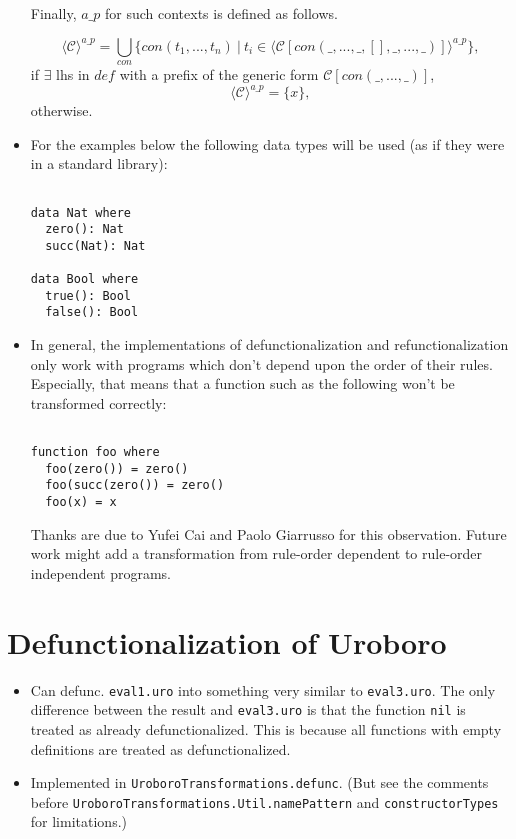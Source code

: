 \documentclass[11pt]{article} %
\begin{document}
\begin{itemize}
Finally, $a\_p$ for such contexts is defined as follows.

\begin{equation*}
\langle \mathcal{C} \rangle^{a\_p} = \bigcup_{con} \{con(t_1, ..., t_n) ~ | ~ t_i \in \langle \mathcal{C}[con(\_, ..., \_, [], \_, ..., \_)] \rangle^{a\_p} \},
\end{equation*}
if $\exists$ lhs in $def$ with a prefix of the generic form $\mathcal{C}[con(\_, ..., \_)]$,
\begin{equation*}
\langle \mathcal{C} \rangle^{a\_p} = \{x\},
\end{equation*}
otherwise.

\item For the examples below the following data types will be used (as if they were in a standard library):
\begin{lstlisting}

data Nat where
  zero(): Nat
  succ(Nat): Nat

data Bool where
  true(): Bool
  false(): Bool

\end{lstlisting}

\item In general, the implementations of defunctionalization and refunctionalization only work with programs which don't depend upon the order of their rules. Especially, that means that a function such as the following won't be transformed correctly:
\begin{lstlisting}

function foo where
  foo(zero()) = zero()
  foo(succ(zero()) = zero()
  foo(x) = x

\end{lstlisting}

Thanks are due to Yufei Cai and Paolo Giarrusso for this observation. Future work might add a transformation from rule-order dependent to rule-order independent programs.

\end{itemize}

\section{Defunctionalization of Uroboro}

\begin{itemize}
\item Can defunc. \texttt{eval1.uro} into something very similar to \texttt{eval3.uro}. The only difference between the result and \texttt{eval3.uro} is that the function \texttt{nil} is treated as already defunctionalized. This is because all functions with empty definitions are treated as defunctionalized.

\item Implemented in \texttt{UroboroTransformations.defunc}. (But see the comments before \texttt{UroboroTransformations.Util.namePattern} and \texttt{constructorTypes} for limitations.)

\end{itemize}
\end{document}
